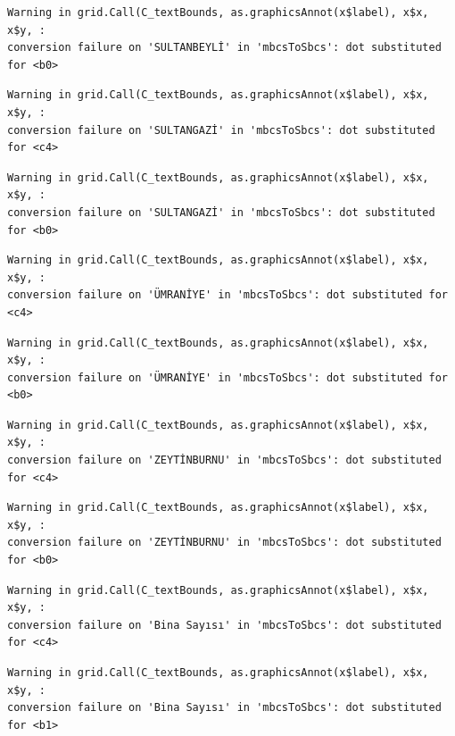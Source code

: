 \documentclass[
  11pt,
  a4paper,
  DIV=11,
  numbers=noendperiod]{scrartcl}
\begin{document}
\begin{verbatim}
Warning in grid.Call(C_textBounds, as.graphicsAnnot(x$label), x$x, x$y, :
conversion failure on 'SULTANBEYLİ' in 'mbcsToSbcs': dot substituted for <b0>
\end{verbatim}

\begin{verbatim}
Warning in grid.Call(C_textBounds, as.graphicsAnnot(x$label), x$x, x$y, :
conversion failure on 'SULTANGAZİ' in 'mbcsToSbcs': dot substituted for <c4>
\end{verbatim}

\begin{verbatim}
Warning in grid.Call(C_textBounds, as.graphicsAnnot(x$label), x$x, x$y, :
conversion failure on 'SULTANGAZİ' in 'mbcsToSbcs': dot substituted for <b0>
\end{verbatim}

\begin{verbatim}
Warning in grid.Call(C_textBounds, as.graphicsAnnot(x$label), x$x, x$y, :
conversion failure on 'ÜMRANİYE' in 'mbcsToSbcs': dot substituted for <c4>
\end{verbatim}

\begin{verbatim}
Warning in grid.Call(C_textBounds, as.graphicsAnnot(x$label), x$x, x$y, :
conversion failure on 'ÜMRANİYE' in 'mbcsToSbcs': dot substituted for <b0>
\end{verbatim}

\begin{verbatim}
Warning in grid.Call(C_textBounds, as.graphicsAnnot(x$label), x$x, x$y, :
conversion failure on 'ZEYTİNBURNU' in 'mbcsToSbcs': dot substituted for <c4>
\end{verbatim}

\begin{verbatim}
Warning in grid.Call(C_textBounds, as.graphicsAnnot(x$label), x$x, x$y, :
conversion failure on 'ZEYTİNBURNU' in 'mbcsToSbcs': dot substituted for <b0>
\end{verbatim}

\begin{verbatim}
Warning in grid.Call(C_textBounds, as.graphicsAnnot(x$label), x$x, x$y, :
conversion failure on 'Bina Sayısı' in 'mbcsToSbcs': dot substituted for <c4>
\end{verbatim}

\begin{verbatim}
Warning in grid.Call(C_textBounds, as.graphicsAnnot(x$label), x$x, x$y, :
conversion failure on 'Bina Sayısı' in 'mbcsToSbcs': dot substituted for <b1>
\end{verbatim}
\end{document}
